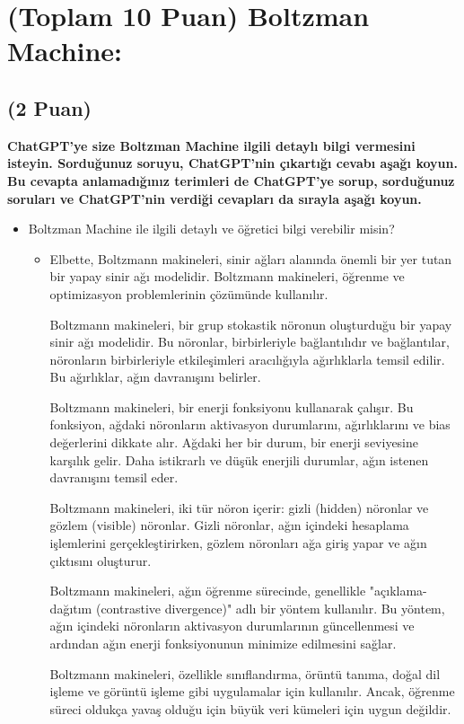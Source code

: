 \documentclass[11pt]{article}
\begin{document}
\section{(Toplam 10 Puan) Boltzman Machine:}

\subsection{(2 Puan)} \textbf{ChatGPT’ye size Boltzman Machine ilgili detaylı bilgi vermesini isteyin. Sorduğunuz soruyu, ChatGPT'nin çıkartığı cevabı aşağı koyun. Bu cevapta anlamadığınız terimleri de ChatGPT’ye sorup, sorduğunuz soruları ve ChatGPT’nin verdiği cevapları da sırayla aşağı koyun.}

\begin{itemize}
        \item {Boltzman Machine ile ilgili detaylı ve öğretici bilgi verebilir misin?}
        \begin{itemize}
            \item {Elbette, Boltzmann makineleri, sinir ağları alanında önemli bir yer tutan bir yapay sinir ağı modelidir. Boltzmann makineleri, öğrenme ve optimizasyon problemlerinin çözümünde kullanılır.

Boltzmann makineleri, bir grup stokastik nöronun oluşturduğu bir yapay sinir ağı modelidir. Bu nöronlar, birbirleriyle bağlantılıdır ve bağlantılar, nöronların birbirleriyle etkileşimleri aracılığıyla ağırlıklarla temsil edilir. Bu ağırlıklar, ağın davranışını belirler.

Boltzmann makineleri, bir enerji fonksiyonu kullanarak çalışır. Bu fonksiyon, ağdaki nöronların aktivasyon durumlarını, ağırlıklarını ve bias değerlerini dikkate alır. Ağdaki her bir durum, bir enerji seviyesine karşılık gelir. Daha istikrarlı ve düşük enerjili durumlar, ağın istenen davranışını temsil eder.

Boltzmann makineleri, iki tür nöron içerir: gizli (hidden) nöronlar ve gözlem (visible) nöronlar. Gizli nöronlar, ağın içindeki hesaplama işlemlerini gerçekleştirirken, gözlem nöronları ağa giriş yapar ve ağın çıktısını oluşturur.

Boltzmann makineleri, ağın öğrenme sürecinde, genellikle "açıklama-dağıtım (contrastive divergence)" adlı bir yöntem kullanılır. Bu yöntem, ağın içindeki nöronların aktivasyon durumlarının güncellenmesi ve ardından ağın enerji fonksiyonunun minimize edilmesini sağlar.

Boltzmann makineleri, özellikle sınıflandırma, örüntü tanıma, doğal dil işleme ve görüntü işleme gibi uygulamalar için kullanılır. Ancak, öğrenme süreci oldukça yavaş olduğu için büyük veri kümeleri için uygun değildir.

}
\end{itemize}
\end{itemize}
\end{document}
